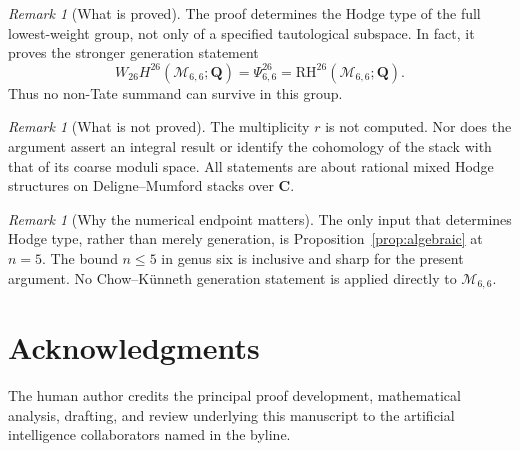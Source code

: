 \documentclass[11pt,reqno]{amsart}
\newcommand{\Q}{\mathbf{Q}}
\newcommand{\M}{\mathcal{M}}
\newcommand{\RH}{\mathrm{RH}}
\theoremstyle{definition}
\theoremstyle{remark}
\newtheorem{remark}[theorem]{Remark}
\begin{document}
\begin{remark}[What is proved]
The proof determines the Hodge type of the full lowest-weight group, not only
of a specified tautological subspace.  In fact, it proves the stronger
generation statement
\[
  W_{26}H^{26}(\M_{6,6};\Q)=\Psi^{26}_{6,6}
  =\RH^{26}(\M_{6,6};\Q).
\]
Thus no non-Tate summand can survive in this group.
\end{remark}

\begin{remark}[What is not proved]
The multiplicity $r$ is not computed.  Nor does the argument assert an
integral result or identify the cohomology of the stack with that of its
coarse moduli space.  All statements are about rational mixed Hodge
structures on Deligne--Mumford stacks over $\mathbf C$.
\end{remark}

\begin{remark}[Why the numerical endpoint matters]
The only input that determines Hodge type, rather than merely generation, is
Proposition~\ref{prop:algebraic} at $n=5$.  The bound $n\leq5$ in genus six is
inclusive and sharp for the present argument.  No Chow--K\"unneth generation
statement is applied directly to $\M_{6,6}$.
\end{remark}

\section*{Acknowledgments}

The human author credits the principal proof development, mathematical
analysis, drafting, and review underlying this manuscript to the artificial
intelligence collaborators named in the byline.
\end{document}
